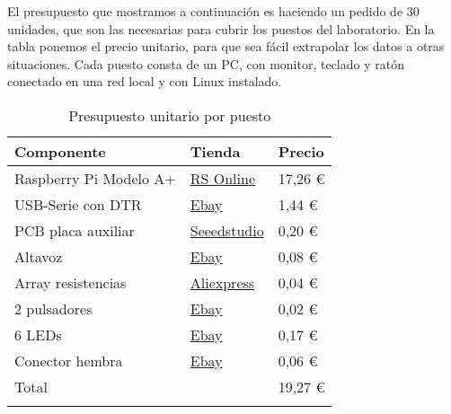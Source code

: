 
El presupuesto que mostramos a continuación es haciendo un pedido de 30 unidades, que
son las necesarias para cubrir los puestos del laboratorio. En la tabla ponemos
el precio unitario, para que sea fácil extrapolar los datos a otras situaciones. Cada
puesto consta de un PC, con monitor, teclado y ratón conectado en una red local y
con Linux instalado.

\begin{longtable}{ p{6cm} | p{4cm} | p{3cm}}
\hline
{\bf Componente} & {\bf Tienda} & {\bf Precio} \\ \hline
Raspberry Pi Modelo A+ & \href{http://es.rs-online.com/web/p/kits-de-desarrollo-de-procesador-y-microcontrolador/8332699/}{RS Online} & 17,26 € \\
USB-Serie con DTR & \href{http://www.ebay.com/itm//400565980256}{Ebay} & 1,44 € \\
PCB placa auxiliar & \href{http://seeedstudio.com/service/index.php?r=pcb}{Seeedstudio} & 0,20 € \\
Altavoz & \href{http://www.ebay.com/itm/261583913099}{Ebay} & 0,08 € \\
Array resistencias & \href{http://www.aliexpress.com/item//729138245.html}{Aliexpress} & 0,04 € \\
2 pulsadores & \href{http://www.ebay.com/itm/261621014025}{Ebay} & 0,02 € \\
6 LEDs & \href{http://www.ebay.com/itm/281410599537}{Ebay} & 0,17 € \\
Conector hembra & \href{http://www.ebay.com/itm/271427325429}{Ebay} & 0,06 € \\ \hline
Total &  & 19,27 € \\ \hline

\caption{Presupuesto unitario por puesto}
\label{tab:presupuesto}
\end{longtable}

  
\chapterend
